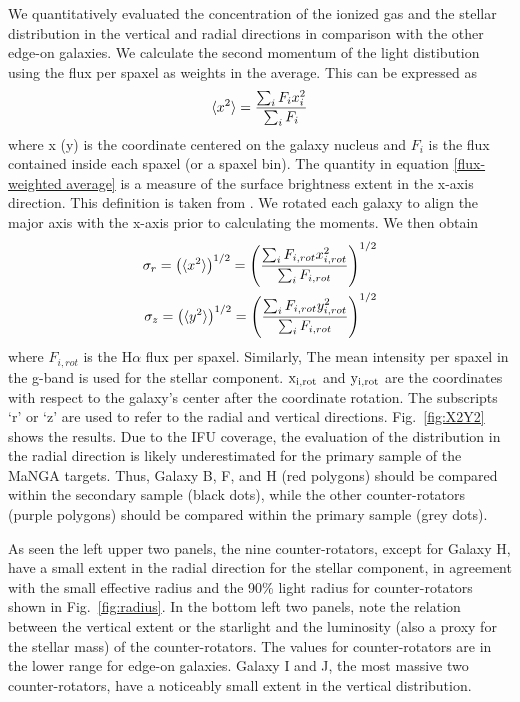 \documentclass[fleqn,usenatbib]{mnras}
\begin{document}
We quantitatively evaluated the concentration of 
the ionized gas and the stellar distribution in the vertical and radial directions
in comparison with the other edge-on galaxies.
We calculate the second momentum of the light distibution
using the flux per spaxel as weights in the average. 
This can be expressed as
\begin{equation} 
  \centering
  \langle x^{2} \rangle =\frac{\sum_{i} F_{i} x_{i}^{2}}{\sum_{i} F_{i}} 
  \label{flux-weighted average}
\end{equation}
where x (y) is the coordinate centered on the galaxy nucleus
and $F_{i}$ is the flux contained inside each spaxel (or a spaxel bin). 
The quantity in equation \ref{flux-weighted average} is a measure of the surface brightness extent in the x-axis direction.
This definition is taken from \citet{Emsellem2007,Cappellari2007}.
We rotated each galaxy to align the major axis with the x-axis prior to calculating the moments.
We then obtain
\begin{equation} 
  \centering
  \begin{split}
    \sigma_{r}=\left( \langle x^{2} \rangle \right) ^{1/2}=
    \left(\frac{\sum_{i} F_{i,rot} x_{i,rot}^{2}}{\sum_{i} F_{i,rot}}\right)^{1/2} \\
    \sigma_{z}=\left( \langle y^{2} \rangle \right) ^{1/2}=
    \left(\frac{\sum_{i} F_{i,rot} y_{i,rot}^{2}}{\sum_{i} F_{i,rot}}\right)^{1/2} \\
  \end{split}
  \label{kinematic_major}
\end{equation}
where $F_{i,rot}$ is the H$\alpha$ flux per spaxel.
Similarly, The mean intensity per spaxel in the g-band is used for the stellar component.
$\rm x_{i,rot}$ and $\rm y_{i,rot}$ are the coordinates 
with respect to the galaxy's center after the coordinate rotation.
The subscripts `r' or `z' are used 
to refer to the radial and vertical directions. 
Fig.~\ref{fig:X2Y2} shows the results.
Due to the IFU coverage, the evaluation of the distribution 
in the radial direction is likely underestimated 
for the primary sample of the MaNGA targets. 
Thus, Galaxy B, F, and H (red polygons) should be compared 
within the secondary sample (black dots), while
the other counter-rotators (purple polygons) should be compared 
within the primary sample (grey dots).

As seen the left upper two panels, 
the nine counter-rotators, except for Galaxy H, have 
a small extent in the radial direction for the stellar component, in agreement with  
the small effective radius and the 90\% light radius 
for counter-rotators shown in Fig.~\ref{fig:radius}.
In the bottom left two panels, 
note 
the relation between the vertical extent or the starlight and 
the luminosity (also a proxy for the stellar mass) of the counter-rotators.
The values for counter-rotators are in the lower range for edge-on galaxies.
Galaxy I and J, the most massive two counter-rotators, 
have a noticeably small extent in the vertical distribution.
\end{document}
